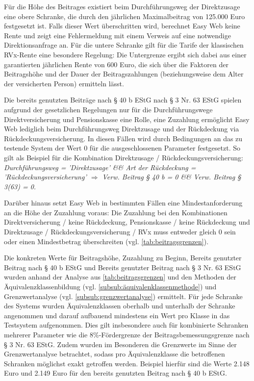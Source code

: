 Für die Höhe des Beitrages existiert beim Durchführungsweg der Direktzusage eine obere Schranke, die durch den jährlichen Maximalbeitrag von 125.000 Euro festgesetzt ist. Falls dieser Wert überschritten wird, berechnet Easy Web keine Rente und zeigt eine Fehlermeldung mit einem Verweis auf eine notwendige Direktionsanfrage an. Für die untere Schranke gilt für die Tarife der klassischen RVx-Rente eine besondere Regelung: Die Untergrenze ergibt sich dabei aus einer garantierten jährlichen Rente von 600 Euro, die sich über die Faktoren der Beitragshöhe und der Dauer der Beitragszahlungen (beziehungsweise dem Alter der versicherten Person) ermitteln lässt.

Die bereits genutzten Beiträge nach § 40 b EStG nach § 3 Nr. 63 EStG spielen aufgrund der gesetzlichen Regelungen nur für die Durchführungswege Direktversicherung und Pensionskasse eine Rolle, eine Zuzahlung ermöglicht Easy Web lediglich beim Durchführungsweg Direktzusage und der Rückdeckung via Rückdeckungsversicherung. In diesen Fällen wird durch Bedingungen an das zu testende System der Wert 0 für die ausgeschlossenen Parameter festgesetzt. So gilt als Beispiel für die Kombination Direktzusage / Rückdeckungsversicherung: \textit{Durchführungsweg = 'Direktzusage' \&\& Art der Rückdeckung = 'Rückdeckungsversicherung' $\Rightarrow$ Verw. Beitrag § 40 b = 0 \&\& Verw. Beitrag § 3(63) = 0.}

Darüber hinaus setzt Easy Web in bestimmten Fällen eine Mindestanforderung an die Höhe der Zuzahlung voraus: Die Zuzahlung bei den Kombinationen Direktversicherung / keine Rückdeckung, Pensionskasse / keine Rückdeckung und Direktzusage / Rückdeckungsversicherung / RVx muss entweder gleich 0 sein oder einen Mindestbetrag überschreiten (vgl. \autoref{tab:beitragsgrenzen}).

\hspace{1cm}Die konkreten Werte für Beitragshöhe, Zuzahlung zu Beginn, Bereits genutzter Beitrag nach § 40 b EStG und Bereits genutzter Beitrag nach § 3 Nr. 63 EStG wurden anhand der Analyse aus \autoref{tab:beitragsgrenzen} und den Methoden der Äquivalenzklassenbildung (vgl. \autoref{subsub:äquivalenklassenmethode}) und Grenzwertanalyse (vgl. \autoref{subsub:grenzwertanalyse}) ermittelt. Für jede Schranke des Systems wurden Äquivalenzklassen oberhalb und unterhalb der Schranke angenommen und darauf aufbauend mindestens ein Wert pro Klasse in das Testsystem aufgenommen. Dies gilt insbesondere auch für kombinierte Schranken mehrerer Parameter wie die 8\%-Fördergrenze der Beitragsbemessungsgrenze nach § 3 Nr. 63 EStG. Zudem wurden im Besonderen die Grenzwerte im Sinne der Grenzwertanalyse betrachtet, sodass pro Äquivalenzklasse die betroffenen Schranken möglichst exakt getroffen werden. Beispiel hierfür sind die Werte 2.148 Euro und 2.149 Euro für den bereits genutzten Beitrag nach § 40 b EStG. 

